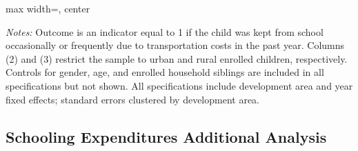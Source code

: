 \documentclass[12pt]{article}
\newcommand*{\TableLagOnePath}{../Paper_3_Tables/Lagged_1Year_Tables}
\begin{document}
		\begin{table}[H]
		\centering
		\begin{adjustbox}{max width=\linewidth, center}
		\begin{threeparttable}
			\caption{Transport Absence by Urban/Rural, IV Estimates}
			\label{tab:rural_attendance}
			{\small}
			\begin{tablenotes}
				\small
				\item \textit{Notes:} Outcome is an indicator equal to 1 if the child was kept from school occasionally or frequently due to transportation costs in the past year. Columns (2) and (3) restrict the sample to urban and rural enrolled children, respectively. Controls for gender, age, and enrolled household siblings are included in all specifications but not shown. All specifications include development area and year fixed effects; standard errors clustered by development area.
			\end{tablenotes}
		\end{threeparttable}
		\end{adjustbox}
	\end{table}

	
	\subsection{Schooling Expenditures Additional Analysis}
	\label{subsec:app_expenditures_add}
\end{document}
